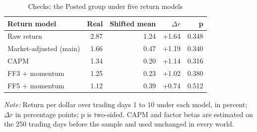 \begin{table}[htbp]
\centering
\small
\setlength{\tabcolsep}{4pt}
\caption{Checks: the Posted group under five return models}
\label{tab:models}
\begin{tabular}{lrrrr}
\toprule
Return model & Real & Shifted mean & $\Delta r$ & p \\
\midrule
Raw return & 2.87 & 1.24 & +1.64 & 0.348 \\
Market-adjusted (main) & 1.66 & 0.47 & +1.19 & 0.340 \\
CAPM & 1.34 & 0.20 & +1.14 & 0.316 \\
FF3 + momentum & 1.25 & 0.23 & +1.02 & 0.380 \\
FF5 + momentum & 1.12 & 0.39 & +0.74 & 0.512 \\
\bottomrule
\end{tabular}
\par\medskip
\begin{minipage}{\linewidth}\footnotesize\textit{Note:} Return per dollar over trading days 1 to 10 under each model, in percent; $\Delta r$ in percentage points; p is two-sided. CAPM and factor betas are estimated on the 250 trading days before the sample and used unchanged in every world.\end{minipage}
\end{table}
